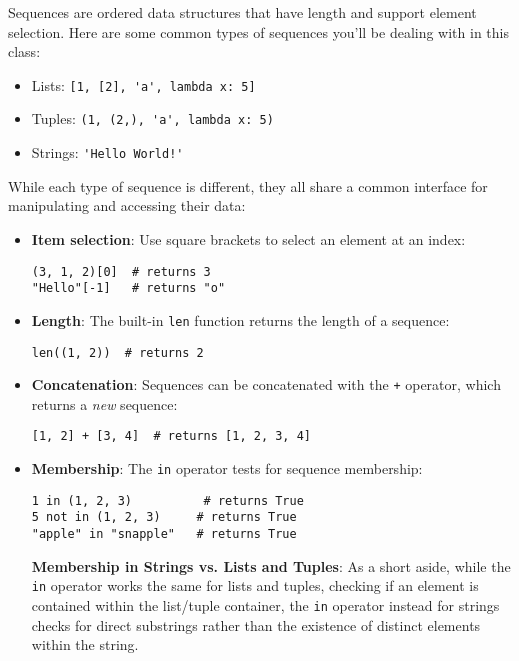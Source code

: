 \small %

Sequences are ordered data structures that have length and support element selection. Here are some common types of sequences you'll be dealing with in this class: 
\begin{itemize}
	\item Lists: \lstinline{[1, [2], 'a', lambda x: 5]}
	\item Tuples: \lstinline{(1, (2,), 'a', lambda x: 5)}
	\item Strings: \lstinline{'Hello World!'}
\end{itemize}

While each type of sequence is different, they all share a common interface for manipulating and accessing their data: 
\begin{itemize}
	\item \textbf{Item selection}: Use square brackets to select an element at an index: 
	\begin{lstlisting}
(3, 1, 2)[0]  # returns 3
"Hello"[-1]   # returns "o"
	\end{lstlisting}

	\item \textbf{Length}: The built-in \lstinline{len} function returns the length of a sequence: 
	\begin{lstlisting}
len((1, 2))  # returns 2
	\end{lstlisting}

	\item \textbf{Concatenation}: Sequences can be concatenated with the \lstinline{+} operator, which returns a \textit{new} sequence:
	\begin{lstlisting}
[1, 2] + [3, 4]  # returns [1, 2, 3, 4]
	\end{lstlisting}

	\item \textbf{Membership}: The \lstinline{in} operator tests for sequence membership: 
	\begin{lstlisting}
1 in (1, 2, 3)          # returns True
5 not in (1, 2, 3)     # returns True
"apple" in "snapple"   # returns True
	\end{lstlisting}

    \subitem \textbf{Membership in Strings vs. Lists and Tuples}: As a short aside, while the \lstinline{in} operator works the same for lists and tuples, checking if an element is contained within the list/tuple container, the \lstinline{in} operator instead for strings checks for direct substrings rather than the existence of distinct elements within the string.


\end{itemize}
